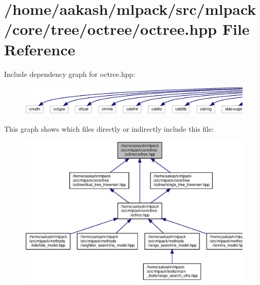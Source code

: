\section{/home/aakash/mlpack/src/mlpack/core/tree/octree/octree.hpp File Reference}
\label{octree_2octree_8hpp}
Include dependency graph for octree.\+hpp\+:
\nopagebreak
\begin{figure}[H]
\begin{center}
\leavevmode
\includegraphics[width=350pt]{octree_2octree_8hpp__incl}
\end{center}
\end{figure}
This graph shows which files directly or indirectly include this file\+:
\nopagebreak
\begin{figure}[H]
\begin{center}
\leavevmode
\includegraphics[width=350pt]{octree_2octree_8hpp__dep__incl}
\end{center}
\end{figure}
